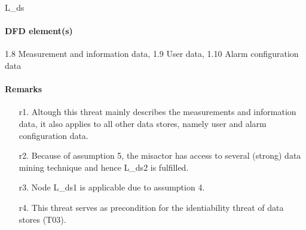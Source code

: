 L\_ds

\paragraph{DFD element(s)}

1.8 Measurement and information data, 1.9 User data, 1.10 Alarm configuration
data

\paragraph{Remarks}

	\begin{enumerate}
         \item[r1.] Altough this threat mainly describes the measurements
         and information data, it also applies to all other data stores, namely
         user and alarm configuration data.
         \item[r2.] Because of assumption 5, the misactor has access to several
         (strong) data mining technique and hence L\_ds2 is fulfilled.
         \item[r3.] Node L\_ds1 is applicable due to assumption 4.
         \item[r4.] This threat serves as precondition for the
         identiability threat of data stores (T03).
    \end{enumerate}

